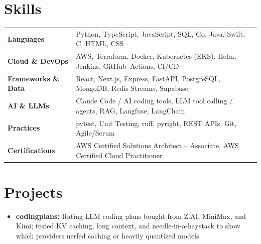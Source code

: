 \documentclass[11pt, letterpaper]{article}
\begin{document}
\section{Skills}
\begin{tabularx}{\textwidth}{@{}l @{\hspace{7pt}} >{\raggedright\arraybackslash}X@{}}
  \textbf{Languages} & Python, TypeScript, JavaScript, SQL, Go, Java, Swift, C, HTML, CSS \\[1pt]
  \textbf{Cloud \& DevOps} & AWS, Terraform, Docker, Kubernetes (EKS), Helm, Jenkins, GitHub~Actions, CI/CD \\[1pt]
  \textbf{Frameworks \& Data} & React, Next.js, Express, FastAPI, PostgreSQL, MongoDB, Redis Streams, Supabase \\[1pt]
  \textbf{AI \& LLMs} & Claude Code / AI coding tools, LLM tool calling / agents, RAG, Langfuse, LangChain \\[1pt]
  \textbf{Practices} & pytest, Unit Testing, ruff, pyright, REST APIs, Git, Agile/Scrum \\[1pt]
  \textbf{Certifications} & AWS Certified Solutions Architect -- Associate, AWS Certified Cloud Practitioner \\
\end{tabularx}

\section{Projects}
\begin{itemize}
  \item \textbf{codingplans:} Rating LLM coding plans bought from Z.AI, MiniMax, and Kimi; tested KV caching, long context, and needle-in-a-haystack to show which providers nerfed caching or heavily quantized models.
\end{itemize}
\end{document}
